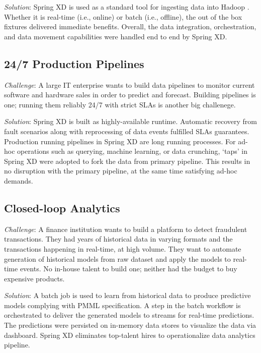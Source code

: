 \textit{Solution}: Spring XD is used as a standard tool for ingesting data 
into Hadoop . Whether it is real-time (i.e., online) or batch 
(i.e., offline),
the out of the box fixtures delivered immediate benefits. Overall, the data
integration, orchestration, and data movement capabilities were handled end
to end by Spring XD.

\subsection{24/7 Production Pipelines}
\textit{Challenge}: A large IT enterprise wants to build data pipelines to
monitor current software and hardware sales in order to predict and forecast.
Building pipelines is one; running them reliably 24/7 with strict SLAs is
another big challenege.

\textit{Solution}: Spring XD is built as highly-available runtime. Automatic
recovery from fault scenarios along with reprocessing of data events fulfilled
SLAs guarantees. Production running pipelines in Spring XD are long running
processes. For ad-hoc operations such as querying, machine learning, or
data crunching, `taps' in Spring XD were adopted to fork the data from primary
pipeline. This results in no disruption with the primary pipeline, at the
same time satisfying ad-hoc demands.

\subsection{Closed-loop Analytics}
\textit{Challenge}: A finance institution wants to build a platform to detect
fraudulent transactions. They had years of historical data in varying formats
and the transactions happening in real-time, at high volume. They want to
automate generation of historical models from raw dataset and apply the models
to real-time events. No in-house talent to build one; neither had the budget to buy expensive products.

\textit{Solution}: A batch job is used to learn from historical data to
produce predictive models complying with PMML specification. A step
in the batch workflow is orchestrated to deliver the generated models to
streams for real-time predictions. The predictions were persisted
on in-memory data stores to visualize the data via dashboard. Spring XD eliminates top-talent hires to operationalize data analytics pipeline.
